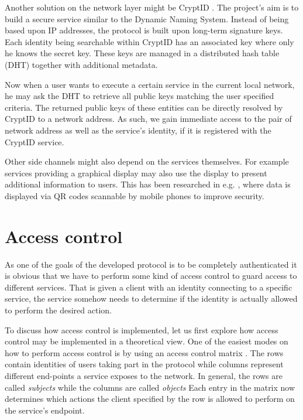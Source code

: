 Another solution on the network layer might be CryptID \cite{malchow2015cryptid}.
The project's aim is to build a secure service similar to the Dynamic Naming System.
Instead of being based upon IP addresses, the protocol is built upon long-term signature keys.
Each identity being searchable within CryptID has an associated key where only he knows the secret key.
These keys are managed in a distributed hash table (DHT) together with additional metadata.

Now when a user wants to execute a certain service in the current local network, he may ask the DHT to retrieve all public keys matching the user specified criteria.
The returned public keys of these entities can be directly resolved by CryptID to a network address.
As such, we gain immediate access to the pair of network address as well as the service's identity, if it is registered with the CryptID service.

Other side channels might also depend on the services themselves.
For example services providing a graphical display may also use the display to present additional information to users.
This has been researched in e.g. \cite{mccune2005seeing,saxena2006secure}, where data is displayed via QR codes scannable by mobile phones to improve security.

\section{Access control}
\label{sec:access-control}

As one of the goals of the developed protocol is to be completely authenticated it is obvious that we have to perform some kind of access control to guard access to different services.
That is given a client with an identity connecting to a specific service, the service somehow needs to determine if the identity is actually allowed to perform the desired action.

To discuss how access control is implemented, let us first explore how access control may be implemented in a theoretical view.
One of the easiest modes on how to perform access control is by using an access control matrix \cite{lampson1974protection,tanenbaum2014modern}.
The rows contain identities of users taking part in the protocol while columns represent different end-points a service exposes to the network.
In general, the rows are called \emph{subjects} while the columns are called \emph{objects}
Each entry in the matrix now determines which actions the client specified by the row is allowed to perform on the service's endpoint.

